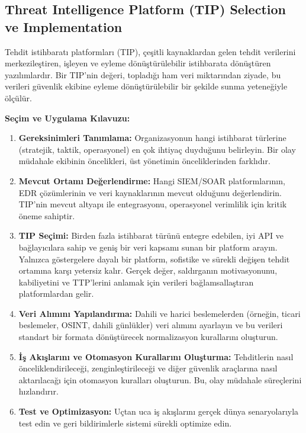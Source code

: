 \subsection{Threat Intelligence Platform (TIP) Selection ve Implementation}

Tehdit istihbaratı platformları (TIP), çeşitli kaynaklardan gelen tehdit verilerini merkezileştiren, işleyen ve eyleme dönüştürülebilir istihbarata dönüştüren yazılımlardır. Bir TIP'nin değeri, topladığı ham veri miktarından ziyade, bu verileri güvenlik ekibine eyleme dönüştürülebilir bir şekilde sunma yeteneğiyle ölçülür.

\textbf{Seçim ve Uygulama Kılavuzu:}

\begin{enumerate}
    \item \textbf{Gereksinimleri Tanımlama:} Organizasyonun hangi istihbarat türlerine (stratejik, taktik, operasyonel) en çok ihtiyaç duyduğunu belirleyin. Bir olay müdahale ekibinin öncelikleri, üst yönetimin önceliklerinden farklıdır.
    \item \textbf{Mevcut Ortamı Değerlendirme:} Hangi SIEM/SOAR platformlarının, EDR çözümlerinin ve veri kaynaklarının mevcut olduğunu değerlendirin. TIP'nin mevcut altyapı ile entegrasyonu, operasyonel verimlilik için kritik öneme sahiptir.
    \item \textbf{TIP Seçimi:} Birden fazla istihbarat türünü entegre edebilen, iyi API ve bağlayıcılara sahip ve geniş bir veri kapsamı sunan bir platform arayın. Yalnızca göstergelere dayalı bir platform, sofistike ve sürekli değişen tehdit ortamına karşı yetersiz kalır. Gerçek değer, saldırganın motivasyonunu, kabiliyetini ve TTP'lerini anlamak için verileri bağlamsallaştıran platformlardan gelir.
    \item \textbf{Veri Alımını Yapılandırma:} Dahili ve harici beslemelerden (örneğin, ticari beslemeler, OSINT, dahili günlükler) veri alımını ayarlayın ve bu verileri standart bir formata dönüştürecek normalizasyon kurallarını oluşturun.
    \item \textbf{İş Akışlarını ve Otomasyon Kurallarını Oluşturma:} Tehditlerin nasıl önceliklendirileceği, zenginleştirileceği ve diğer güvenlik araçlarına nasıl aktarılacağı için otomasyon kuralları oluşturun. Bu, olay müdahale süreçlerini hızlandırır.
    \item \textbf{Test ve Optimizasyon:} Uçtan uca iş akışlarını gerçek dünya senaryolarıyla test edin ve geri bildirimlerle sistemi sürekli optimize edin.
\end{enumerate}

